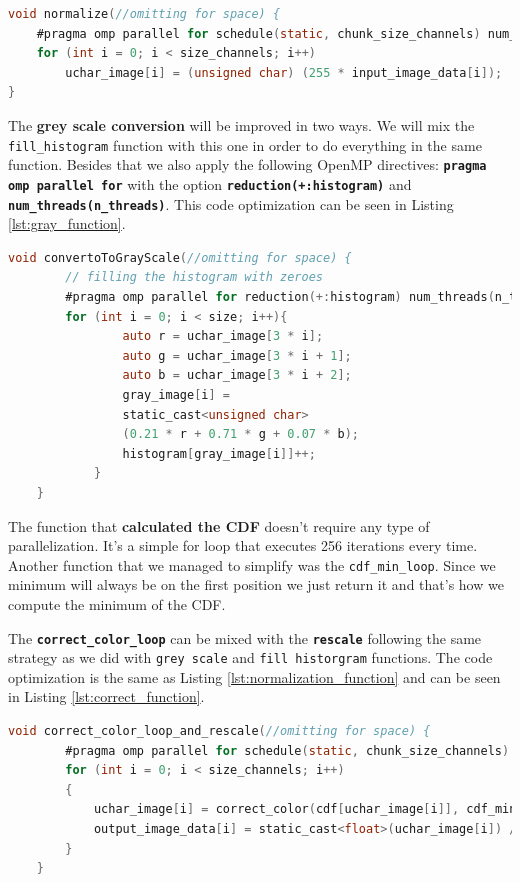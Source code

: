 \documentclass[sigconf]{acmart}
\begin{document}
\begin{lstlisting}[language=C, caption=Normalization Function, label={lst:normalization_function}]
void normalize(//omitting for space) {
    #pragma omp parallel for schedule(static, chunk_size_channels) num_threads(n_threads)
    for (int i = 0; i < size_channels; i++)
        uchar_image[i] = (unsigned char) (255 * input_image_data[i]);
}
\end{lstlisting}
The \textbf{grey scale conversion} will be improved in two ways. We will mix the \texttt{fill\_histogram}
function with this one in order to do everything in the same function. Besides that we also apply the following OpenMP directives: \texttt{\textbf{pragma omp parallel for}}
with the option \texttt{\textbf{reduction(+:histogram)}} and \texttt{\textbf{num\_threads(n\_threads)}}. This code optimization can be seen in Listing \ref{lst:gray_function}.
\begin{lstlisting}[language=C, caption=Grey Conversion Function, label={lst:gray_function}]
	void convertoToGrayScale(//omitting for space) {
       	// filling the histogram with zeroes
        #pragma omp parallel for reduction(+:histogram) num_threads(n_threads)
        for (int i = 0; i < size; i++){
                auto r = uchar_image[3 * i];
                auto g = uchar_image[3 * i + 1];
                auto b = uchar_image[3 * i + 2];
                gray_image[i] = 
                static_cast<unsigned char>
                (0.21 * r + 0.71 * g + 0.07 * b);
                histogram[gray_image[i]]++;
            }
    }
\end{lstlisting}
The function that \textbf{calculated the CDF} doesn't require any type of parallelization. It's a simple for loop that executes 256 iterations every time.
Another function that we managed to simplify was the \texttt{cdf\_min\_loop}. Since we minimum will always be on the first position we just return it and that's how we compute
the minimum of the CDF.

The \texttt{\textbf{correct\_color\_loop}} can be mixed with the \texttt{\textbf{rescale}} following the same strategy as we did with \texttt{grey scale} and \texttt{fill historgram} functions. The code optimization is the same as Listing \ref{lst:normalization_function} and can be seen in Listing \ref{lst:correct_function}.
\begin{lstlisting}[language=C, caption=Color Correction Function, label={lst:correct_function}]
	void correct_color_loop_and_rescale(//omitting for space) {
        #pragma omp parallel for schedule(static, chunk_size_channels) num_threads(n_threads)
        for (int i = 0; i < size_channels; i++)
        {
            uchar_image[i] = correct_color(cdf[uchar_image[i]], cdf_min);
            output_image_data[i] = static_cast<float>(uchar_image[i]) / 255.0f;
        }
    }
\end{lstlisting}
\end{document}

